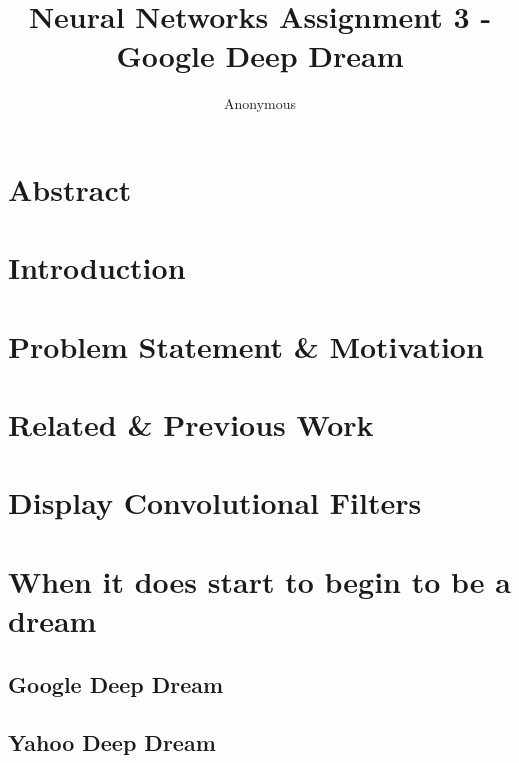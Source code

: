 \documentclass{article}[]
\begin{document}
	\title{Neural Networks Assignment 3 - Google Deep Dream}
	\author{Anonymous}
	\maketitle
	\lstset{
		basicstyle=\ttfamily,
		keywordstyle=\bfseries,
		language=Java,
		frame=single,
		aboveskip=11pt,
		belowskip=11pt,
		breaklines=true,
		breakatwhitespace=false,
		showspaces=false,
		showstringspaces=false,
		numbers=left,
		stepnumber=1,    
		firstnumber=1,
		numberfirstline=true
	}
	
	\section{Abstract}
	
	\section{Introduction}
	
	\section{Problem Statement \& Motivation}
	
	\section{Related \& Previous Work}
	\section{Display Convolutional Filters}
	\section{When it does start to begin to be a dream}
	
	
	\subsection{Google Deep Dream}
	\subsection{Yahoo Deep Dream}
	
\end{document}
